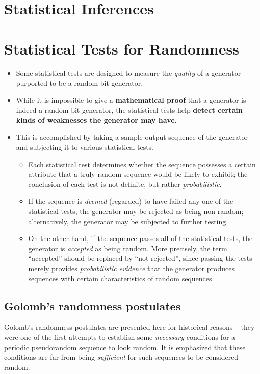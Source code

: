 \documentclass[12pt,openany]{book}
\theoremstyle{definition}
\begin{document}
	\newpage
	\chapter{Statistical Inferences}
	
	\newpage
	\chapter{Statistical Tests for Randomness}
	
	\begin{itemize}
		\item Some statistical tests are designed to measure the \textit{quality} of a generator purported to be a random bit generator.
		\item While it is impossible to give a \textbf{mathematical proof} that a generator is indeed a random bit generator, the statistical tests help \textbf{detect certain kinds of weaknesses the generator may have}.
		\item This is accomplished by taking a sample output sequence of the generator and subjecting it to various statistical tests.
		\begin{itemize}
			\item Each statistical test determines whether the sequence possesses a certain attribute that a truly random sequence would be likely to exhibit; the conclusion of each test is not definite, but rather \textit{probabilistic}.
			\item If the sequence is \textit{deemed} (regarded) to have failed any one of the statistical tests, the generator may be rejected as being non-random; alternatively, the generator may be subjected to further testing.
			\item On the other hand, if the sequence passes all of the statistical tests, the generator is \textit{accepted} as being random. More precisely, the term ``accepted'' should be replaced by ``not rejected'', since passing the tests merely provides \textit{probabilistic evidence} that the generator produces sequences with certain characteristics of random sequences.
		\end{itemize}
	\end{itemize}

	
	\section*{Golomb’s randomness postulates}
	
	Golomb’s randomness postulates are presented here for historical reasons – they were one of the first attempts to establish some \textit{necessary} conditions for a periodic pseudorandom sequence to look random. It is emphasized that these conditions are far from being \textit{sufficient} for such sequences to be considered random.
	
\end{document}
